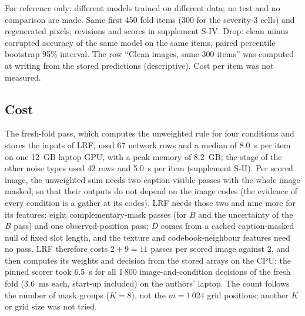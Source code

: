 \begin{table}[!t]
\centering
\caption{Baseline Models: Reference Accuracy of CLIP ViT-L/14 and SigLIP so400m per Condition}
\label{tab:baselines}
\footnotesize
\setlength{\tabcolsep}{2pt}
\resizebox{\columnwidth}{!}{}

\vspace{2pt}
\parbox{\columnwidth}{\scriptsize For reference only: different models trained on different data; no test and no comparison are made.
Same first 450 fold items (300 for the severity-3 cells) and regenerated pixels; revisions and scores in supplement S-IV. Drop: clean minus corrupted accuracy of the same model on the same items, paired percentile bootstrap 95\% interval. The row
``Clean images, same 300 items'' was computed at writing from the stored predictions (descriptive). Cost per item was not measured.}
\end{table}

\subsection{Cost}\label{sec:study2-cost}
The fresh-fold pass, which computes the unweighted rule for four conditions and stores the inputs of LRF, used 67 network rows and a median of 8.0~s per item on one 12~GB laptop GPU, with a peak memory of 8.2~GB; the stage of the other noise
types used 42 rows and 5.0~s per item (supplement S-II).
Per scored image, the unweighted sum needs two caption-visible passes with the whole image masked, so that their outputs do not depend on the image codes (the evidence of every condition is a gather at its codes).
LRF needs those two and nine more for its features: eight complementary-mask passes (for $B$ and the uncertainty of the $B$ pass) and one observed-position pass; $D$ comes from a cached caption-masked null of fixed slot length, and the texture and codebook-neighbour features need no pass.
LRF therefore costs $2+9=11$ passes per scored image against 2, and then computes its weights and decision from the stored arrays on the CPU: the pinned scorer took 6.5~s for all 1\,800 image-and-condition decisions of the fresh fold (3.6~ms each, start-up included) on the authors' laptop.
The count follows the number of mask groups ($K=8$), not the $m=1\,024$ grid positions; another $K$ or grid size was not tried.

